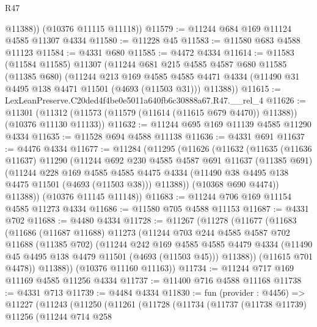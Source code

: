 \begin{lexlean}{R47}
\begin{coremodule}
          @11388))
      (@10376 @11115 @11118))
@11579 := @11244 @684 @169 @11124 @4585 @11307 @4334
@11580 := @11228 @45
@11583 := @11580 @683 @4588 @11123
@11584 := @4331 @680
@11585 := @4472 @4334
@11614 := @11583
    (@11584 @11585)
    @11307
    (@11244
      @681
      @215
      @4585
      @4587
      @680
      @11585
      (@11385 @680)
      (@11244
        @213
        @169
        @4585
        @4585
        @4471
        @4334
        (@11490 @31 @4495 @138 @4471 @11501 (@4693 (@11503 @31)))
        @11388))
@11615 := LexLeanPreserve.C20ded4f4be0e5011a640fb6c30888a67.R47.__rel_4
@11626 := @11301
    (@11312 (@11573 (@11579 (@11614 (@11615 @679 @4470)) @11388)) (@10376 @11130 @11133))
@11632 := @11244 @695 @169 @11139 @4585 @11290 @4334
@11635 := @11528 @694 @4588 @11138
@11636 := @4331 @691
@11637 := @4476 @4334
@11677 := @11284
    (@11295
      (@11626
        (@11632
          (@11635
            (@11636 @11637)
            @11290
            (@11244
              @692
              @230
              @4585
              @4587
              @691
              @11637
              (@11385 @691)
              (@11244
                @228
                @169
                @4585
                @4585
                @4475
                @4334
                (@11490 @38 @4495 @138 @4475 @11501 (@4693 (@11503 @38)))
                @11388))
            (@10368 @690 @4474))
          @11388))
      (@10376 @11145 @11148))
@11683 := @11244 @706 @169 @11154 @4585 @11273 @4334
@11686 := @11580 @705 @4588 @11153
@11687 := @4331 @702
@11688 := @4480 @4334
@11728 := @11267
    (@11278
      (@11677
        (@11683
          (@11686
            (@11687 @11688)
            @11273
            (@11244
              @703
              @244
              @4585
              @4587
              @702
              @11688
              (@11385 @702)
              (@11244
                @242
                @169
                @4585
                @4585
                @4479
                @4334
                (@11490 @45 @4495 @138 @4479 @11501 (@4693 (@11503 @45)))
                @11388))
            (@11615 @701 @4478))
          @11388))
      (@10376 @11160 @11163))
@11734 := @11244 @717 @169 @11169 @4585 @11256 @4334
@11737 := @11400 @716 @4588 @11168
@11738 := @4331 @713
@11739 := @4484 @4334
@11830 := fun (provider : @4456) =>
  @11227
    (@11243
      (@11250
        (@11261
          (@11728
            (@11734
              (@11737
                (@11738 @11739)
                @11256
                (@11244
                  @714
                  @258

\end{coremodule}
\end{lexlean}
